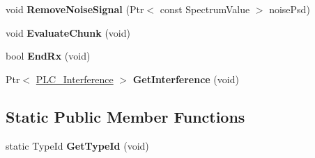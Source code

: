 \begin{DoxyCompactItemize}
\item 
\hypertarget{classns3_1_1PLC__LinkPerformanceModel_a74c5f94e5009cd3437907a1002adafd7}{void {\bfseries \-Remove\-Noise\-Signal} (\-Ptr$<$ const \-Spectrum\-Value $>$ noise\-Psd)}\label{classns3_1_1PLC__LinkPerformanceModel_a74c5f94e5009cd3437907a1002adafd7}

\item 
\hypertarget{classns3_1_1PLC__LinkPerformanceModel_a4177290a3e8a87f3feaf5d5bda4e6d92}{void {\bfseries \-Evaluate\-Chunk} (void)}\label{classns3_1_1PLC__LinkPerformanceModel_a4177290a3e8a87f3feaf5d5bda4e6d92}

\item 
\hypertarget{classns3_1_1PLC__LinkPerformanceModel_a69b682f3a98903861eeec686225f93c6}{bool {\bfseries \-End\-Rx} (void)}\label{classns3_1_1PLC__LinkPerformanceModel_a69b682f3a98903861eeec686225f93c6}

\item 
\hypertarget{classns3_1_1PLC__LinkPerformanceModel_a8ae427ca85d9e2edb5cfca7d37b808fc}{\-Ptr$<$ \hyperlink{classns3_1_1PLC__Interference}{\-P\-L\-C\-\_\-\-Interference} $>$ {\bfseries \-Get\-Interference} (void)}\label{classns3_1_1PLC__LinkPerformanceModel_a8ae427ca85d9e2edb5cfca7d37b808fc}

\end{DoxyCompactItemize}
\subsection*{\-Static \-Public \-Member \-Functions}
\begin{DoxyCompactItemize}
\item 
\hypertarget{classns3_1_1PLC__LinkPerformanceModel_a915883fff6663f866803318f0daaa066}{static \-Type\-Id {\bfseries \-Get\-Type\-Id} (void)}\label{classns3_1_1PLC__LinkPerformanceModel_a915883fff6663f866803318f0daaa066}

\end{DoxyCompactItemize}
